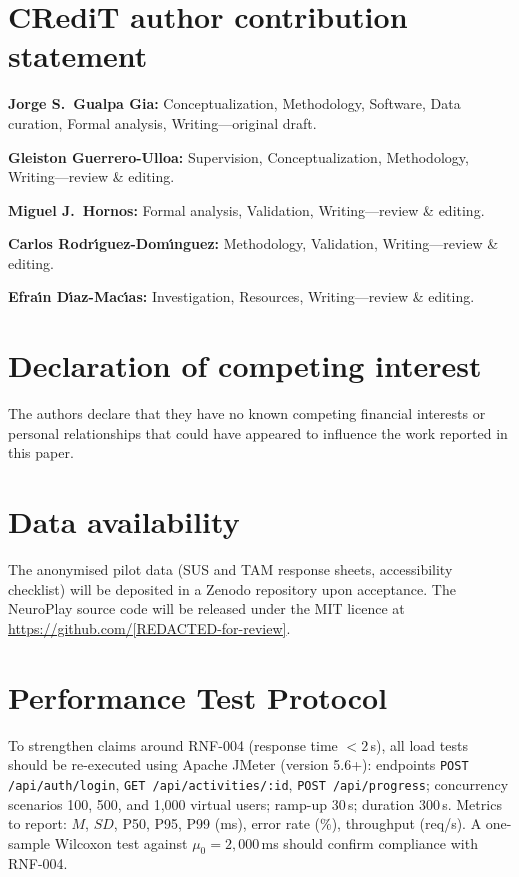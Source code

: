 \documentclass[preprint,12pt]{elsarticle}
\begin{document}
    \section*{CRediT author contribution statement}
        \textbf{Jorge S.~Gualpa Gia:} Conceptualization, Methodology, Software, Data curation, Formal analysis, Writing---original draft.
        
        \textbf{Gleiston Guerrero-Ulloa:} Supervision, Conceptualization, Methodology, Writing---review \& editing.
        
        \textbf{Miguel J.~Hornos:} Formal analysis, Validation, Writing---review \& editing.
        
        \textbf{Carlos Rodr\'{\i}guez-Dom\'{\i}nguez:} Methodology, Validation, Writing---review \& editing.
        
        \textbf{Efra\'{\i}n D\'{\i}az-Mac\'{\i}as:} Investigation, Resources, Writing---review \& editing.
    
    \section*{Declaration of competing interest}
        The authors declare that they have no known competing financial interests or personal relationships that could have appeared to influence the work reported in this paper.
    
    \section*{Data availability}
        The anonymised pilot data (SUS and TAM response sheets, accessibility checklist) will be deposited in a Zenodo repository upon acceptance. The NeuroPlay source code will be released under the MIT licence at \url{https://github.com/[REDACTED-for-review]}.
    
    \appendix
        \section{Performance Test Protocol}
        \label{app:performance}
        To strengthen claims around RNF-004 (response time $<2$\,s), all load tests should be re-executed using Apache JMeter (version 5.6+): endpoints \texttt{POST /api/auth/login}, \texttt{GET /api/activities/:id}, \texttt{POST /api/progress}; concurrency scenarios 100, 500, and 1,000 virtual users; ramp-up 30\,s; duration 300\,s. Metrics to report: $M$, $SD$, P50, P95, P99 (ms), error rate (\%), throughput (req/s). A one-sample Wilcoxon test against $\mu_0 = 2{,}000$\,ms should confirm compliance with RNF-004.
    
    
    
\end{document}
